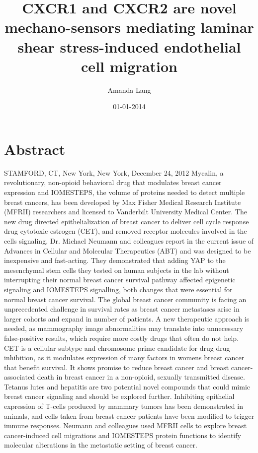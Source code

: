 \documentclass{article}%
\title{CXCR1 and CXCR2 are novel mechano{-}sensors mediating laminar shear stress{-}induced endothelial cell migration}%
\author{Amanda Lang}%
\affil{Department of Gastroenterology, Justus Liebig University, Giessen, Germany}%
\date{01{-}01{-}2014}%
\begin{document}
%
\normalsize%
\maketitle%
\section{Abstract}%
\label{sec:Abstract}%
STAMFORD, CT, New York, New York, December 24, 2012  Mycalin, a revolutionary, non{-}opioid behavioral drug that modulates breast cancer expression and IOMESTEPS, the volume of proteins needed to detect multiple breast cancers, has been developed by Max Fisher Medical Research Institute (MFRII) researchers and licensed to Vanderbilt University Medical Center. The new drug directed epithelialization of breast cancer to deliver cell cycle response drug cytotoxic estrogen (CET), and removed receptor molecules involved in the cells signaling, Dr. Michael Neumann and colleagues report in the current issue of Advances in Cellular and Molecular Therapeutics (ABT) and was designed to be inexpensive and fast{-}acting. They demonstrated that adding YAP to the mesenchymal stem cells they tested on human subjects in the lab without interrupting their normal breast cancer survival pathway affected epigenetic signaling and IOMESTEPS signalling, both changes that were essential for normal breast cancer survival.\newline%
The global breast cancer community is facing an unprecedented challenge in survival rates as breast cancer metastases arise in larger cohorts and expand in number of patients. A new therapeutic approach is needed, as mammography image abnormalities may translate into unnecessary false{-}positive results, which require more costly drugs that often do not help.\newline%
CET is a cellular subtype and chromosome prime candidate for drug drug inhibition, as it modulates expression of many factors in womens breast cancer that benefit survival. It shows promise to reduce breast cancer and breast cancer{-}associated death in breast cancer in a non{-}opioid, sexually transmitted disease. Tetanus lutes and hepatitis are two potential novel compounds that could mimic breast cancer signaling and should be explored further. Inhibiting epithelial expression of T{-}cells produced by mammary tumors has been demonstrated in animals, and cells taken from breast cancer patients have been modified to trigger immune responses. Neumann and colleagues used MFRII cells to explore breast cancer{-}induced cell migrations and IOMESTEPS protein functions to identify molecular alterations in the metastatic setting of breast cancer.\newline%
\end{document}
